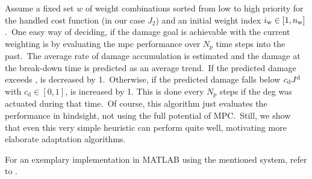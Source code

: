 Assume a fixed set $w$ of \nw weight combinations sorted from low to high priority for the handled cost function (in our case $J_2$) and an initial weight index $i_\mathrm{w} \in [1, n_\mathrm{w}]$.\ 
One easy way of deciding, if the damage goal is achievable with the current weighting is by evaluating the \ac{mpc} performance over $N_p$ time steps into the past.\ 
The average rate of damage accumulation \Jps is estimated and the damage at the break-down time is predicted as an average trend.\
If the predicted damage exceeds \Jd, \iw is decreased by 1.\ 
Otherwise, if the predicted damage falls below $c_\mathrm{d}J^\mathrm{d}$ with $c_\mathrm{d}\in\left[0, 1\right]$, \iw is increased by 1.
This is done every $N_p$ steps if the \ac{deg} was actuated during that time.\
Of course, this algorithm just evaluates the performance in hindsight, not using the full potential of MPC.\ 
Still, we show that even this very simple heuristic can perform quite well, motivating more elaborate adaptation algorithms.
%

For an exemplary implementation in MATLAB using the mentioned system, refer to .
